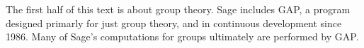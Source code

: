 The first half of this text is about group theory.  Sage includes GAP, a program designed primarly for just group theory, and in continuous development since 1986.  Many of Sage's computations for groups ultimately are performed by GAP.